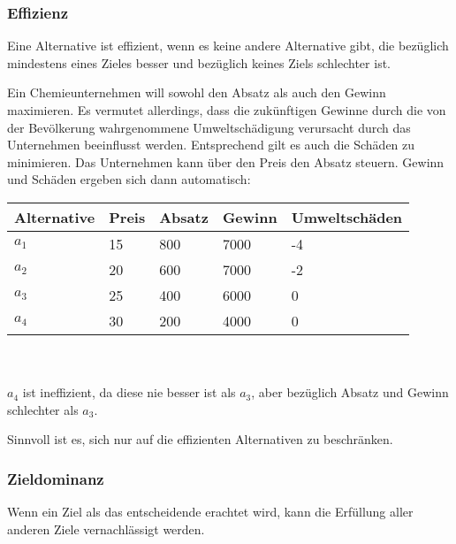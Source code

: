 \subsubsection{Effizienz}
Eine Alternative ist effizient, wenn es keine andere Alternative gibt, die bezüglich mindestens eines Zieles besser und bezüglich keines Ziels schlechter ist.
\begin{example} 	
	Ein Chemieunternehmen will sowohl den Absatz als auch den Gewinn maximieren. Es vermutet allerdings, dass die zukünftigen Gewinne durch die von der Bevölkerung wahrgenommene Umweltschädigung verursacht durch das Unternehmen beeinflusst werden. Entsprechend gilt es auch die Schäden zu minimieren. Das Unternehmen kann über den Preis den Absatz steuern. Gewinn und Schäden ergeben sich dann automatisch:\\
	\begin{tabular}{|l|l|l|l|l|}
		\hline
		\textbf{Alternative} & \textbf{Preis} & \textbf{Absatz} & \textbf{Gewinn} & \textbf{Umweltschäden} \\ \hline
		$a_1$ & 15 & 800 & 7000 & -4 \\ \hline
		$a_2$ & 20 & 600 & 7000 & -2 \\ \hline
		$a_3$ & 25 & 400 & 6000 & 0 \\ \hline
		$a_4$ & 30 & 200 & 4000 & 0 \\ \hline
	\end{tabular} \\ \ \\
	$a_4$ ist ineffizient, da diese nie besser ist als $a_3$, aber bezüglich Absatz und Gewinn schlechter als $a_3$.
\end{example}
Sinnvoll ist es, sich nur auf die effizienten Alternativen zu beschränken.

\subsubsection{Zieldominanz}
Wenn ein Ziel als das entscheidende erachtet wird, kann die Erfüllung aller anderen Ziele vernachlässigt werden.

